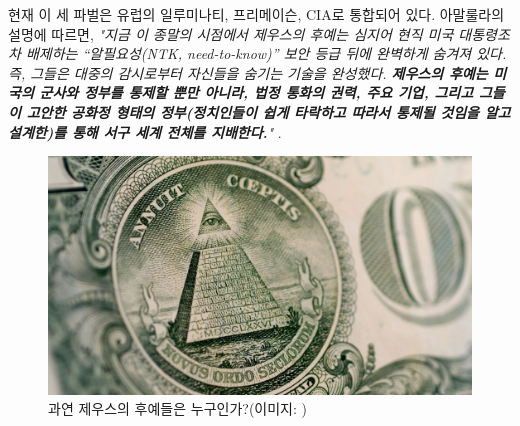\documentclass[10pt,twocolumn,letterpaper]{article}
\begin{document}
현재 이 세 파벌은 유럽의 일루미나티, 프리메이슨, CIA로 통합되어 있다. 아말룰라의 설명에 따르면, \textit{"지금 이 종말의 시점에서 제우스의 후예는 심지어 현직 미국 대통령조차 배제하는 “알필요성(NTK, need-to-know)” 보안 등급 뒤에 완벽하게 숨겨져 있다. 즉, 그들은 대중의 감시로부터 자신들을 숨기는 기술을 완성했다. \textbf{제우스의 후예는 미국의 군사와 정부를 통제할 뿐만 아니라, 법정 통화의 권력, 주요 기업, 그리고 그들이 고안한 공화정 형태의 정부(정치인들이 쉽게 타락하고 따라서 통제될 것임을 알고 설계한)를 통해 서구 세계 전체를 지배한다.}"} \cite{33,34}.

\begin{figure}[t]
\begin{center}
   \includegraphics[width=1\linewidth]{illuminati.jpg}

\end{center}
   \caption{과연 제우스의 후예들은 누구인가?(이미지: \cite{35})}
\label{fig:10}
\label{fig:onecol}
\end{figure}
\end{document}
